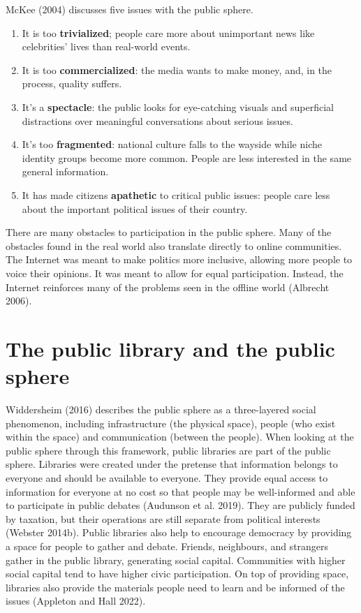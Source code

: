 \documentclass[
  letterpaper,
  DIV=11,
  numbers=noendperiod]{scrreprt}
\begin{document}
McKee (2004) discusses five issues with the public sphere.

\begin{enumerate}
\def\labelenumi{\arabic{enumi}.}
\item
  It is too \textbf{trivialized}; people care more about unimportant
  news like celebrities' lives than real-world events.
\item
  It is too \textbf{commercialized}: the media wants to make money, and,
  in the process, quality suffers.
\item
  It's a \textbf{spectacle}: the public looks for eye-catching visuals
  and superficial distractions over meaningful conversations about
  serious issues.
\item
  It's too \textbf{fragmented}: national culture falls to the wayside
  while niche identity groups become more common. People are less
  interested in the same general information.
\item
  It has made citizens \textbf{apathetic} to critical public issues:
  people care less about the important political issues of their
  country.
\end{enumerate}

There are many obstacles to participation in the public sphere. Many of
the obstacles found in the real world also translate directly to online
communities. The Internet was meant to make politics more inclusive,
allowing more people to voice their opinions. It was meant to allow for
equal participation. Instead, the Internet reinforces many of the
problems seen in the offline world (Albrecht 2006).

\section{The public library and the public
sphere}\label{the-public-library-and-the-public-sphere}

Widdersheim (2016) describes the public sphere as a three-layered social
phenomenon, including infrastructure (the physical space), people (who
exist within the space) and communication (between the people). When
looking at the public sphere through this framework, public libraries
are part of the public sphere. Libraries were created under the pretense
that information belongs to everyone and should be available to
everyone. They provide equal access to information for everyone at no
cost so that people may be well-informed and able to participate in
public debates (Audunson et al. 2019). They are publicly funded by
taxation, but their operations are still separate from political
interests (Webster 2014b). Public libraries also help to encourage
democracy by providing a space for people to gather and debate. Friends,
neighbours, and strangers gather in the public library, generating
social capital. Communities with higher social capital tend to have
higher civic participation. On top of providing space, libraries also
provide the materials people need to learn and be informed of the issues
(Appleton and Hall 2022).
\end{document}
